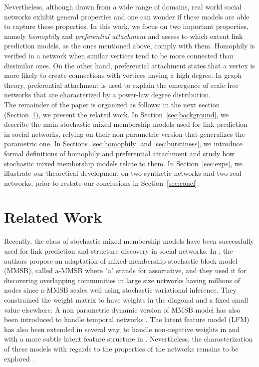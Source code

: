 \documentclass[journal]{IEEEtran}
\begin{document}
Nevertheless, although drawn from a wide range of domains, real world social networks exhibit general properties and one can wonder if these models are able to capture these properties. In this work, we focus on two important properties, namely \textit{homophily} and \textit{preferential attachment} \cite{Newman2010, Barabasi2003} and assess to which extent link prediction models, as the ones mentioned above, comply with them. Homophily is verified in a network when similar vertices tend to be more connected than dissimilar ones. On the other hand, preferential attachment states that a vertex is more likely to create connections with vertices having a high degree. In graph theory, preferential attachment is used to explain the emergence of scale-free networks that are characterized by a power-law degree distribution.~\\

The remainder of the paper is organized as follows: in the next section (Section~\ref{sec:rel-work}), we present the related work. In Section~\ref{sec:background}, we describe the main stochastic mixed membership models used for link prediction in social networks, relying on their non-parametric version that generalizes the parametric one. In Sections~\ref{sec:homophily} and \ref{sec:burstiness}, we introduce formal definitions of homophily and preferential attachment and study how stochastic mixed membership models relate to them. In Section~\ref{sec:exps}, we illustrate our theoretical development on two synthetic networks and two real networks, prior to restate our conclusions in Section~\ref{sec:concl}.

\section{Related Work}
\label{sec:rel-work}

Recently,  the class of stochastic mixed membership models have been successfully used for link prediction and structure discovery in social networks.  In \cite{AMMSB}, the authors  propose an adaptation of mixed-membership stochastic block model (MMSB), called a-MMSB where "a" stands for assortative, and they used it for discovering overlapping communities in large size networks having millions of nodes since a-MMSB  scales well using stochastic variational inference. They constrained the weight matrix to have weights in the diagonal and a fixed small value elsewhere. A non parametric dynamic version of MMSB model has also been introduced to  handle temporal networks \cite{fan2015dynamic}. The latent feature model (LFM) has also been extended in several way, to handle non-negative weights in \cite{IMRM} and with a more subtle latent feature structure in \cite{ILAM}. Nevertheless, the characterization of these models with regards to the properties of the networks remains to be explored \cite{jacobs2014unified}. ~\\
\end{document}
